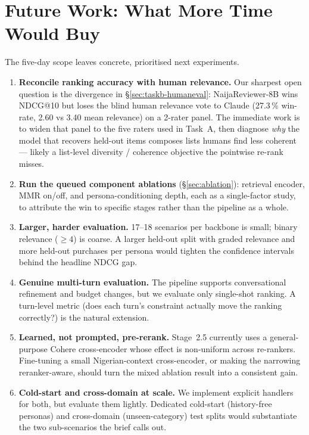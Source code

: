 \documentclass[sigconf,nonacm,balance]{acmart}
\begin{document}
\section{Future Work: What More Time Would Buy}
\label{sec:futurework}

The five-day scope leaves concrete, prioritised next experiments.

\begin{enumerate}[leftmargin=*]
  \item \textbf{Reconcile ranking accuracy with human relevance.} Our sharpest
        open question is the divergence in \S\ref{sec:taskb-humaneval}:
        NaijaReviewer-8B wins NDCG@10 but loses the blind human relevance vote
        to Claude (27.3\,\% win-rate, 2.60 vs 3.40 mean relevance) on a 2-rater
        panel. The immediate work is to widen that panel to the five raters
        used in Task~A, then diagnose \emph{why} the model that recovers
        held-out items composes lists humans find less coherent --- likely a
        list-level diversity / coherence objective the pointwise re-rank misses.
  \item \textbf{Run the queued component ablations} (\S\ref{sec:ablation}):
        retrieval encoder, MMR on/off, and persona-conditioning depth, each as
        a single-factor study, to attribute the win to specific stages rather
        than the pipeline as a whole.
  \item \textbf{Larger, harder evaluation.} 17--18 scenarios per backbone is
        small; binary relevance ($\geq 4$) is coarse. A larger held-out split
        with graded relevance and more held-out purchases per persona would
        tighten the confidence intervals behind the headline NDCG gap.
  \item \textbf{Genuine multi-turn evaluation.} The pipeline supports
        conversational refinement and budget changes, but we evaluate only
        single-shot ranking. A turn-level metric (does each turn's constraint
        actually move the ranking correctly?) is the natural extension.
  \item \textbf{Learned, not prompted, pre-rerank.} Stage~2.5 currently uses a
        general-purpose Cohere cross-encoder whose effect is non-uniform across
        re-rankers. Fine-tuning a small Nigerian-context cross-encoder, or
        making the narrowing reranker-aware, should turn the mixed ablation
        result into a consistent gain.
  \item \textbf{Cold-start and cross-domain at scale.} We implement explicit
        handlers for both, but evaluate them lightly. Dedicated cold-start
        (history-free personas) and cross-domain (unseen-category) test splits
        would substantiate the two sub-scenarios the brief calls out.
\end{enumerate}
\end{document}
